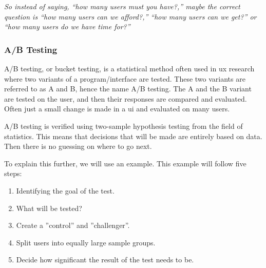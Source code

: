 \textit{
So instead of saying, “how many users must you have?,” maybe the correct question is “how many users can we afford?,” “how many users can we get?” or “how many users do we have time for?”
} \cite{lazar2017research} 








\subsubsection{A/B Testing}%
\label{sub:A/B Testing}
 

A/B testing, or bucket testing, is a statistical method often used in \acrfull{ux} research where two variants of a program/interface are tested. These two variants are referred to as A and B, hence the name A/B testing. The A and the B variant are tested on the user, and then their responses are compared and evaluated. Often just a small change is made in a \acrshort{ui} and evaluated on many users. 

A/B testing is verified using two-sample hypothesis testing from the field of statistics. This means that decisions that will be made are entirely based on data. Then there is no guessing on where to go next.

To explain this further, we will use an example.
This example will follow five steps: 
\begin{enumerate}
  \item Identifying the goal of the test. 
  \item What will be tested? 
 \item Create a ''control'' and ''challenger''. 
 \item Split users into equally large sample groups.
 \item Decide how significant the result of the test needs to be.
\end{enumerate}
 
